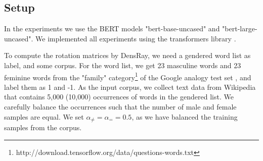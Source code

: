 \subsection{Setup}
In the experiments we use the BERT models "bert-base-uncased" and "bert-large-uncased".
 We implemented all experiments using the transformers library \citep{wolf2019huggingfaces}.

To compute the rotation matrices by DensRay, we need a gendered word list as label, and some corpus. For the word list, we get 23 masculine words and 23 feminine words from the "family" category\footnote{http://download.tensorflow.org/data/questions-words.txt} of the Google analogy test set \citep{mikolov2013efficient}, and label them as 1 and -1. As the input corpus, we collect text data from Wikipedia that contains 5,000 (10,000) occurrences of words in the gendered list. We carefully balance the occurrences such that the number of male and female samples are equal. We set  $\alpha_{\neq}=\alpha_{=}=0.5$, as we have balanced the training samples from the corpus.

